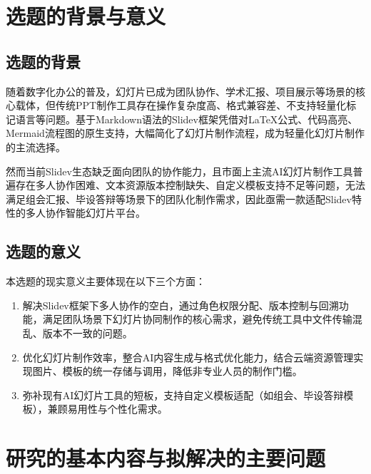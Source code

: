 \section{选题的背景与意义}
\subsection{选题的背景}
随着数字化办公的普及，幻灯片已成为团队协作、学术汇报、项目展示等场景的核心载体，但传统PPT制作工具存在操作复杂度高、格式兼容差、不支持轻量化标记语言等问题。基于Markdown语法的Slidev框架凭借对LaTeX公式、代码高亮、Mermaid流程图的原生支持，大幅简化了幻灯片制作流程，成为轻量化幻灯片制作的主流选择。

然而当前Slidev生态缺乏面向团队的协作能力，且市面上主流AI幻灯片制作工具普遍存在多人协作困难、文本资源版本控制缺失、自定义模板支持不足等问题，无法满足组会汇报、毕设答辩等场景下的团队化制作需求，因此亟需一款适配Slidev特性的多人协作智能幻灯片平台。

\subsection{选题的意义}
本选题的现实意义主要体现在以下三个方面：
\begin{enumerate}[label=(\arabic*)]
    \item 解决Slidev框架下多人协作的空白，通过角色权限分配\cite{zhang2013rbac,wei2025rbaccloud}、版本控制与回溯功能\cite{SXDS202505026,XMGJ202006028}，满足团队场景下幻灯片协同制作的核心需求，避免传统工具中文件传输混乱、版本不一致的问题。
    \item 优化幻灯片制作效率，整合AI内容生成与格式优化能力，结合云端资源管理\cite{li2015filenet,zhang2024javaweb}实现图片、模板的统一存储与调用，降低非专业人员的制作门槛。
    \item 弥补现有AI幻灯片工具的短板，支持自定义模板适配（如组会、毕设答辩模板），兼顾易用性与个性化需求。
\end{enumerate}


\section{研究的基本内容与拟解决的主要问题}

